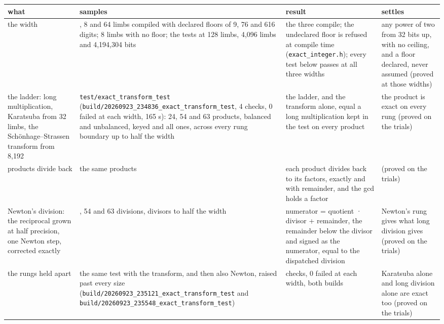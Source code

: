 {\footnotesize
\setlength{\tabcolsep}{6pt}
\begin{longtable}{>{\RaggedRight\arraybackslash}p{}>{\RaggedRight\arraybackslash}p{}>{\RaggedRight\arraybackslash}p{}>{\RaggedRight\arraybackslash}p{}}
\toprule
what & samples & result & settles \\
\midrule
\endhead
the width & 1, 8 and 64 limbs compiled with declared floors of 9, 76 and 616 digits; 8 limbs with no floor; the tests at 128 limbs, 4,096 limbs and 4,194,304 bits & the three compile; the undeclared floor is refused at compile time (\texttt{exact\_\allowbreak{}integer.\allowbreak{}h}); every test below passes at all three widths & any power of two from 32 bits up, with no ceiling, and a floor declared, never assumed (proved at those widths) \\
the ladder: long multiplication, Karatsuba from 32 limbs, the Schönhage–Strassen transform from 8,192 & \texttt{test/\allowbreak{}exact\_\allowbreak{}transform\_\allowbreak{}test} (\texttt{build/\allowbreak{}20260923\_\allowbreak{}234836\_\allowbreak{}exact\_\allowbreak{}transform\_\allowbreak{}test}, 4 checks, 0 failed at each width, 165 s): 24, 54 and 63 products, balanced and unbalanced, keyed and all ones, across every rung boundary up to half the width & the ladder, and the transform alone, equal a long multiplication kept in the test on every product & the product is exact on every rung (proved on the trials) \\
products divide back & the same products & each product divides back to its factors, exactly and with remainder, and the gcd holds a factor & (proved on the trials) \\
Newton's division: the reciprocal grown at half precision, one Newton step, corrected exactly & 24, 54 and 63 divisions, divisors to half the width & numerator = quotient · divisor + remainder, the remainder below the divisor and signed as the numerator, equal to the dispatched division & Newton's rung gives what long division gives (proved on the trials) \\
the rungs held apart & the same test with the transform, and then also Newton, raised past every size (\texttt{build/\allowbreak{}20260923\_\allowbreak{}235121\_\allowbreak{}exact\_\allowbreak{}transform\_\allowbreak{}test} and \texttt{build/\allowbreak{}20260923\_\allowbreak{}235548\_\allowbreak{}exact\_\allowbreak{}transform\_\allowbreak{}test}) & 4 checks, 0 failed at each width, both builds & Karatsuba alone and long division alone are exact too (proved on the trials) \\

\end{longtable}}
